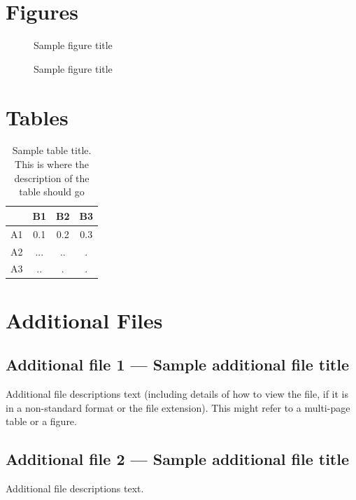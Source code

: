 \documentclass{bmcart}
\begin{document}
\begin{backmatter}

\section*{Figures}
  \begin{figure}[h!]
  \caption{Sample figure title}
\end{figure}

\begin{figure}[h!]
  \caption{Sample figure title}
\end{figure}


\section*{Tables}
\begin{table}[h!]
\caption{Sample table title. This is where the description of the table should go}
  \begin{tabular}{cccc}
    \hline
    & B1  &B2   & B3\\ \hline
    A1 & 0.1 & 0.2 & 0.3\\
    A2 & ... & ..  & .\\
    A3 & ..  & .   & .\\ \hline
  \end{tabular}
\end{table}


\section*{Additional Files}
  \subsection*{Additional file 1 --- Sample additional file title}
    Additional file descriptions text (including details of how to
    view the file, if it is in a non-standard format or the file extension).  This might
    refer to a multi-page table or a figure.

  \subsection*{Additional file 2 --- Sample additional file title}
    Additional file descriptions text.

\end{backmatter}
\end{document}

